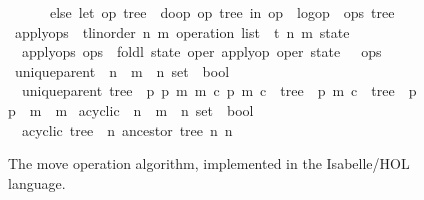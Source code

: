 \documentclass[sigplan,anonymous]{acmart}
\renewcommand{\isacartoucheopen}{}
\renewcommand{\isacartoucheclose}{}
\begin{document}
\begin{figure}
\begin{isabellebody}
\ \ \ \ \ \ else\ let\ {\isacharparenleft}op{}{\isacharcomma}\ tree{}{\isacharparenright}\ {\isacharequal}\ do{\isacharunderscore}op\ {\isacharparenleft}op{}{\isacharcomma}\ tree{}{\isacharparenright}\ in\ {\isacharparenleft}op{}\ {\isacharhash}\ logop\ {\isacharhash}\ ops{\isacharcomma}\ tree{}{\isacharparenright}{\isacharparenright}{\isacartoucheclose}\isanewline
\isanewline
{}\isamarkupfalse%
\ apply{\isacharunderscore}ops\ {\isacharcolon}{\isacharcolon}\ {\isacartoucheopen}{\isacharparenleft}{\isacharprime}t{\isacharcolon}{\isacharcolon}{\isacharbraceleft}linorder{\isacharbraceright}{\isacharcomma}\ {\isacharprime}n{\isacharcomma}\ {\isacharprime}m{\isacharparenright}\ operation\ list\ {\isasymRightarrow}\ {\isacharparenleft}{\isacharprime}t{\isacharcomma}\ {\isacharprime}n{\isacharcomma}\ {\isacharprime}m{\isacharparenright}\ state{\isacartoucheclose}\ \isanewline
\ \ {\isacartoucheopen}apply{\isacharunderscore}ops\ ops\ {\isasymequiv}\ foldl\ {\isacharparenleft}{\isasymlambda}state\ oper{\isachardot}\ apply{\isacharunderscore}op\ oper\ state{\isacharparenright}\ {\isacharparenleft}{\isacharbrackleft}{\isacharbrackright}{\isacharcomma}\ {\isacharbraceleft}{\isacharbraceright}{\isacharparenright}\ ops{\isacartoucheclose}\isanewline
\isanewline
{}\isamarkupfalse%
\ unique{\isacharunderscore}parent\ {\isacharcolon}{\isacharcolon}\ {\isacartoucheopen}{\isacharparenleft}{\isacharprime}n\ {\isasymtimes}\ {\isacharprime}m\ {\isasymtimes}\ {\isacharprime}n{\isacharparenright}\ set\ {\isasymRightarrow}\ bool{\isacartoucheclose}\ \isanewline
\ \ {\isacartoucheopen}unique{\isacharunderscore}parent\ tree\ {\isasymequiv}\ {\isacharparenleft}{\isasymforall}p{}\ p{}\ m{}\ m{}\ c{\isachardot}\ {\isacharparenleft}p{}{\isacharcomma}\ m{}{\isacharcomma}\ c{\isacharparenright}\ {\isasymin}\ tree\ {\isasymand}\ {\isacharparenleft}p{}{\isacharcomma}\ m{}{\isacharcomma}\ c{\isacharparenright}\ {\isasymin}\ tree\ {\isasymlongrightarrow}\ p{}\ {\isacharequal}\ p{}\ {\isasymand}\ m{}\ {\isacharequal}\ m{}{\isacharparenright}{\isacartoucheclose}\isanewline%
\isanewline
{}\isamarkupfalse%
\ acyclic\ {\isacharcolon}{\isacharcolon}\ {\isacartoucheopen}{\isacharparenleft}{\isacharprime}n\ {\isasymtimes}\ {\isacharprime}m\ {\isasymtimes}\ {\isacharprime}n{\isacharparenright}\ set\ {\isasymRightarrow}\ bool{\isacartoucheclose}\ \isanewline
\ \ {\isacartoucheopen}acyclic\ tree\ {\isasymequiv}\ {\isacharparenleft}{\isasymnexists}n{\isachardot}\ ancestor\ tree\ n\ n{\isacharparenright}{\isacartoucheclose}
\end{isabellebody}
\caption{The move operation algorithm, implemented in the Isabelle/HOL language.}
\label{fig:code}
\end{figure}
\end{document}
